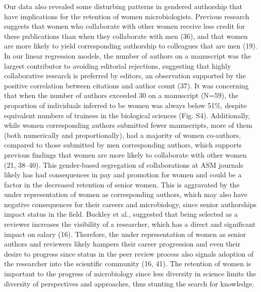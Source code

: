 \documentclass[11pt,]{article}
\begin{document}
Our data also revealed some disturbing patterns in gendered authorship
that have implications for the retention of women microbiologists.
Previous research suggests that women who collaborate with other women
receive less credit for these publications than when they collaborate
with men (36), and that women are more likely to yield corresponding
authorship to colleagues that are men (19). In our linear regression
models, the number of authors on a manuscript was the largest
contributor to avoiding editorial rejections, suggesting that highly
collaborative research is preferred by editors, an observation supported
by the positive correlation between citations and author count (37). It
was concerning that when the number of authors exceeded 30 on a
manuscript (N=59), the proportion of individuals inferred to be women
was always below 51\%, despite equivalent numbers of trainees in the
biological sciences (Fig. S4). Additionally, while women corresponding
authors submitted fewer manuscripts, more of them (both numerically and
proportionally), had a majority of women co-authors, compared to those
submitted by men corresponding authors, which supports previous findings
that women are more likely to collaborate with other women (21, 38--40).
This gender-based segregation of collaborations at ASM journals likely
has had consequences in pay and promotion for women and could be a
factor in the decreased retention of senior women. This is aggravated by
the under representation of women as corresponding authors, which may
also have negative consequences for their careers and microbiology,
since senior authorships impact status in the field. Buckley et al.,
suggested that being selected as a reviewer increases the visibility of
a researcher, which has a direct and significant impact on salary (16).
Therefore, the under representation of women as senior authors and
reviewers likely hampers their career progression and even their desire
to progress since status in the peer review process also signals
adoption of the researcher into the scientific community (16, 41). The
retention of women is important to the progress of microbiology since
less diversity in science limits the diversity of perspectives and
approaches, thus stunting the search for knowledge.
\end{document}
